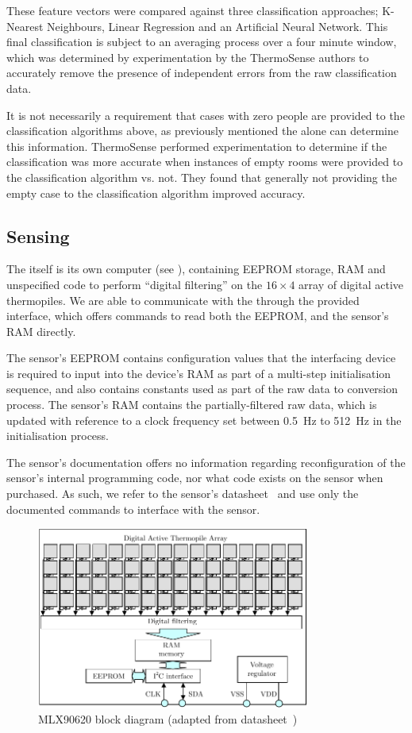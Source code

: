 \documentclass[../thesis/thesis.tex]{subfiles}
\begin{document}
These feature vectors were compared against three classification approaches; K-Nearest Neighbours, Linear Regression and an Artificial Neural Network. This final classification is subject to an averaging process over a four minute window, which was determined by experimentation by the ThermoSense authors to accurately remove the presence of independent errors from the raw classification data.

It is not necessarily a requirement that cases with zero people are provided to the classification algorithms above, as previously mentioned the \pir alone can determine this information. ThermoSense performed experimentation to determine if the classification was more accurate when instances of empty rooms were provided to the classification algorithm vs. not. They found that generally not providing the empty case to the classification algorithm improved accuracy.

\subsection{Sensing}
The \mlx itself is its own computer (see ), containing EEPROM storage, RAM and unspecified code to perform ``digital filtering'' on the $16 \times 4$ array of digital active thermopiles. We are able to communicate with the \mlx through the provided \iic interface, which offers commands to read both the EEPROM, and the sensor's RAM directly. 

The sensor's EEPROM contains configuration values that the interfacing device is required to input into the device's RAM as part of a multi-step initialisation sequence, and also contains constants used as part of the raw data to \dc conversion process. The sensor's RAM contains the partially-filtered raw data, which is updated with reference to a clock frequency set between 0.5~Hz to 512~Hz in the initialisation process.

The sensor's documentation offers no information regarding reconfiguration of the sensor's internal programming code, nor what code exists on the sensor when purchased. As such, we refer to the sensor's datasheet~\cite{MLXDatasheet} and use only the documented commands to interface with the sensor.

\begin{figure}
\centering
\includegraphics[width=0.8\textwidth]{../diagrams/mlx-block-diagram.pdf}
\caption{MLX90620 block diagram (adapted from datasheet~\cite{MLXDatasheet})}
\label{fig:exps:blockdia}
\end{figure}
\end{document}

